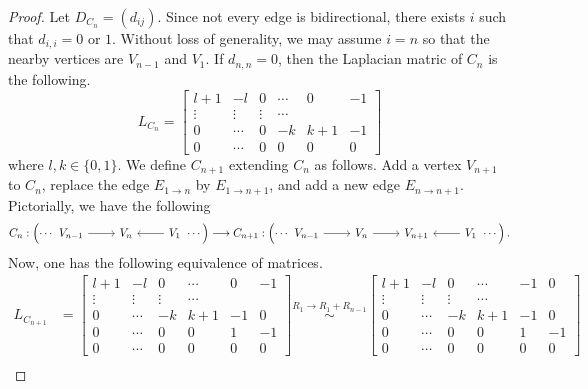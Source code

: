 \documentclass[11pt,reqno]{amsart}
\theoremstyle{definition}
\theoremstyle{plain}
\begin{document}
		\begin{proof}
			Let $D_{C_n} = (d_{ij})$. Since not every edge is bidirectional, there exists $i$ such that $d_{i,i} = 0$ or $1$.
			Without loss of generality, we may assume $i = n$ so that the nearby vertices are $V_{n-1}$ and $V_1$.
			If $d_{n,n} = 0$, 
			then the Laplacian matric of $C_n$ is the following. 
			$$
			L_{C_n} = 
			\begin{bmatrix}
				l + 1 & -l & 0 & \cdots & 0 & -1 \\
				\vdots & \vdots & \vdots & \cdots \\
				0 & \cdots & 0 & -k & k+1 & -1 \\
				0 & \cdots & 0 & 0 & 0 & 0 
			\end{bmatrix}$$
			where $l, k \in \{ 0, 1 \}$. 
			We define $C_{n+1}$ extending $C_n$ as follows. 
			Add a vertex $V_{n+1}$ to $C_n$, replace the edge $E_{1\to n}$ by $E_{1 \to n+1}$, and add a new edge $E_{n \to n+1}$. 
			Pictorially, we have the following
			\[
				C_n: \left( \cdots \begin{tikzcd}
					V_{n-1} \arrow[r] & V_n & V_1 \arrow[l] 
				\end{tikzcd} \cdots \right)
				\longrightarrow
				C_{n+1}: \left( \cdots \begin{tikzcd}
					V_{n-1} \arrow[r] & V_n \arrow[r] & V_{n+1} &  V_1 \arrow[l] 
				\end{tikzcd} \cdots \right).
			\]
			Now, one has the following equivalence of matrices.
			\begin{align}
			L_{C_{n+1}} &= 
			\begin{bmatrix} 
				l + 1 & -l & 0 & \cdots & 0 & -1 \\
				\vdots & \vdots & \vdots & \cdots \\
				0 & \cdots & -k & k+1 & -1 &0 \\
				0 & \cdots & 0 & 0 & 1 & -1 \\
				0 & \cdots & 0 & 0 & 0 & 0 
			\end{bmatrix} 
			\stackrel{R_{1} \to R_1 + R_{n-1}}\sim 
			\begin{bmatrix} 
				l + 1 & -l & 0 & \cdots & -1 & 0 \\
				\vdots & \vdots & \vdots & \cdots \\
				0 & \cdots & -k & k+1 & -1 &0 \\
				0 & \cdots & 0 & 0 & 1 & -1 \\
				0 & \cdots & 0 & 0 & 0 & 0 
			\end{bmatrix} \\

\end{align}
\end{proof}
\end{document}
